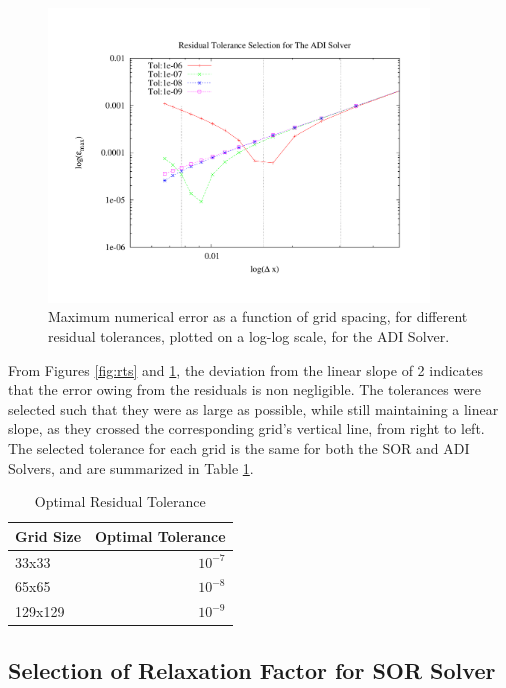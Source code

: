 \begin{figure}[h!]
\center
\includegraphics[width=0.9\textwidth]{plots/rta}
\caption{Maximum numerical error as a function of grid spacing, for different residual tolerances, plotted on a log-log scale, for the ADI Solver.}
\label{fig:rta}
\end{figure}


From Figures \ref{fig:rts} and \ref{fig:rta}, the deviation from the linear slope of 2 indicates that the error owing from the residuals is non negligible.  The tolerances were selected such that they were as large as possible, while still maintaining a linear slope, as they crossed the corresponding grid's vertical line, from right to left.  The selected tolerance for each grid is the same for both the SOR and ADI Solvers, and are summarized in Table \ref{tab:rt}.


\begin{table}
\center
\caption{Optimal Residual Tolerance}
\label{tab:rt}

\begin{tabular}{l r}
\hline
Grid Size & Optimal Tolerance \\
\hline 
33x33   & $10^{-7}$  \\
65x65   & $10^{-8}$  \\
129x129 & $10^{-9}$  \\
\hline  
\end{tabular}
\end{table}



	\subsection{Selection of Relaxation Factor for SOR Solver}
	\label{sec:rf_sor}

